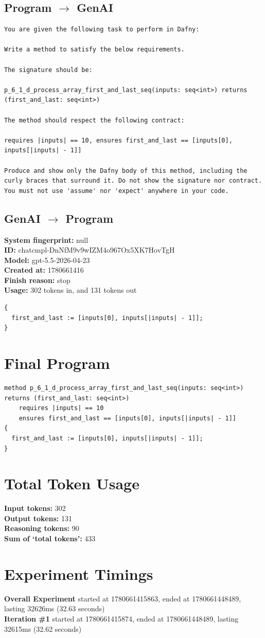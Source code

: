 \documentclass{article}
\begin{document}
\subsection*{Program $\rightarrow$ GenAI}
\begin{lstlisting}
You are given the following task to perform in Dafny:

Write a method to satisfy the below requirements.

The signature should be:

p_6_1_d_process_array_first_and_last_seq(inputs: seq<int>) returns (first_and_last: seq<int>)

The method should respect the following contract:

requires |inputs| == 10, ensures first_and_last == [inputs[0], inputs[|inputs| - 1]]

Produce and show only the Dafny body of this method, including the curly braces that surround it. Do not show the signature nor contract. You must not use 'assume' nor 'expect' anywhere in your code.
\end{lstlisting}
\subsection*{GenAI $\rightarrow$ Program}
\textbf{System fingerprint: }null
\\\textbf{ID: }chatcmpl-DnNfM9v9wIZM4o967Ox5XK7HovTgH
\\\textbf{Model: }gpt-5.5-2026-04-23
\\\textbf{Created at: }1780661416
\\\textbf{Finish reason: }stop
\\\textbf{Usage: }302 tokens in, and 131 tokens out
\begin{lstlisting}
{
  first_and_last := [inputs[0], inputs[|inputs| - 1]];
}
\end{lstlisting}
\section*{Final Program}
\begin{lstlisting}
method p_6_1_d_process_array_first_and_last_seq(inputs: seq<int>) returns (first_and_last: seq<int>)
	requires |inputs| == 10
	ensures first_and_last == [inputs[0], inputs[|inputs| - 1]]
{
  first_and_last := [inputs[0], inputs[|inputs| - 1]];
}
\end{lstlisting}
\section*{Total Token Usage}
\textbf{Input tokens: }302
\\\textbf{Output tokens: }131
\\\textbf{Reasoning tokens: }90
\\\textbf{Sum of `total tokens': }433
\section*{Experiment Timings}
\textbf{Overall Experiment} started at 1780661415863, ended at 1780661448489, lasting 32626ms (32.63 seconds)
\\\textbf{Iteration \#1} started at 1780661415874, ended at 1780661448489, lasting 32615ms (32.62 seconds)
\end{document}
